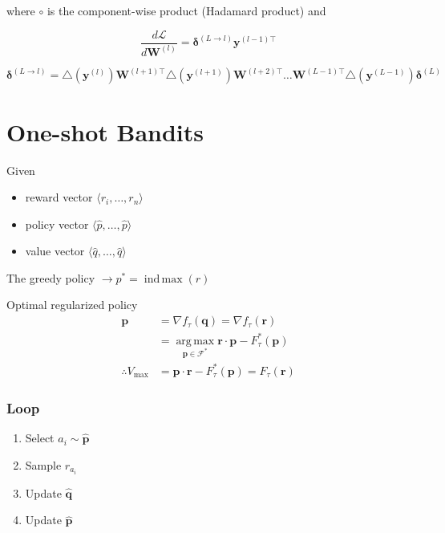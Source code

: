 \documentclass[10pt]{article}
\newcommand{\indmax}{\operatorname{ind\,max}}
\newcommand{\argmax}{\operatorname{arg\,max}}
\theoremstyle{definition}
\begin{document}
\noindent
where $\circ$ is the component-wise product (Hadamard product) and

\begin{equation*}
\frac{d\mathcal{L}}{d\mathbf{W}^{(l)}} = \pmb{\delta}^{(L\rightarrow l)}\mathbf{y}^{(l-1)\top}
\end{equation*}

\begin{equation*}
\pmb{\delta}^{(L\rightarrow l)} = \triangle(\mathbf{y}^{(l)})\mathbf{W}^{(l+1)\top}\triangle(\mathbf{y}^{(l+1)})\mathbf{W}^{(l+2)\top}\hdots\mathbf{W}^{(L-1)\top}\triangle(\mathbf{y}^{(L-1)})\pmb{\delta}^{(L)}
\end{equation*}

\section*{One-shot Bandits}

Given

\begin{itemize}
\item reward vector $\langle r_i, \hdots, r_n \rangle$
\item policy vector $\langle \hat{p}, \hdots, \hat{p} \rangle$
\item value vector $\langle \hat{q}, \hdots, \hat{q} \rangle$
\end{itemize}

The greedy policy $\rightarrow p^* = \indmax(r)$

Optimal regularized policy 
\begin{equation*}
\begin{aligned}
\mathbf{p} & = \nabla f_{\tau}(\textbf{q}) = \nabla f_{\tau}(\mathbf{r}) \\
& = \argmax\limits_{\mathbf{p} \in \mathcal{F}^*} \mathbf{r}\cdot \mathbf{p} - F^*_{\tau}(\mathbf{p}) \\
\therefore V_{\text{max}} & = \mathbf{p}\cdot \textbf{r} - F^*_{\tau}(\mathbf{p}) = F_{\tau}(\mathbf{r})
\end{aligned}
\end{equation*}

\subsubsection*{Loop}
\begin{enumerate}
\item Select $a_i \sim \mathbf{\hat{p}}$
\item Sample $r_{a_i}$
\item Update $\mathbf{\hat{q}}$
\item Update $\mathbf{\hat{p}}$
\end{enumerate}
\end{document}
